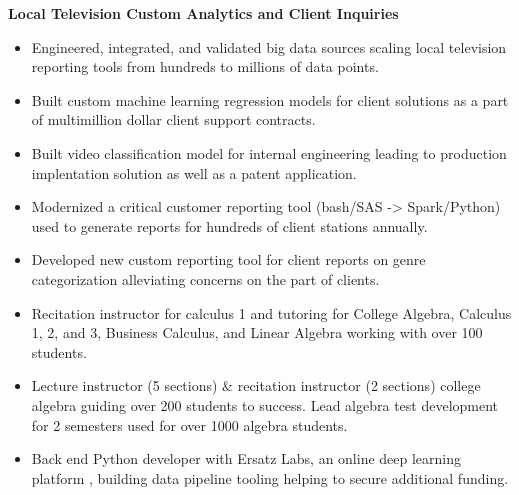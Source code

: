 \documentclass[10pt,a4paper,ragged2e]{altacv}
\begin{document}
\textbf{Local Television Custom Analytics and Client Inquiries}
\begin{itemize}
\item Engineered, integrated, and validated big data sources scaling local television reporting tools from hundreds to millions of data points.
\item Built custom machine learning regression models for client solutions as a part of multimillion dollar client support contracts.
\item Built video classification model for internal engineering leading to production implentation solution as well as a patent application.
\item Modernized a critical customer reporting tool (bash/SAS -> Spark/Python) used to generate reports for hundreds of client stations annually.
\item Developed new custom reporting tool for client reports on genre categorization alleviating concerns on the part of clients.
\end{itemize}

\divider


\begin{itemize}
\item Recitation instructor for calculus 1 and tutoring for College Algebra, Calculus 1, 2, and 3, Business Calculus, and Linear Algebra working with over 100 students.
\end{itemize}

\divider


\begin{itemize}
\item Lecture instructor (5 sections) {\&} recitation instructor (2 sections) college algebra guiding over 200 students to success. Lead algebra test development for 2 semesters used for over 1000 algebra students.
\end{itemize}
\divider


\begin{itemize}
\item Back end Python developer with Ersatz Labs, an online deep learning platform , building data pipeline tooling helping to secure additional funding.
\end{itemize}




\end{document}

